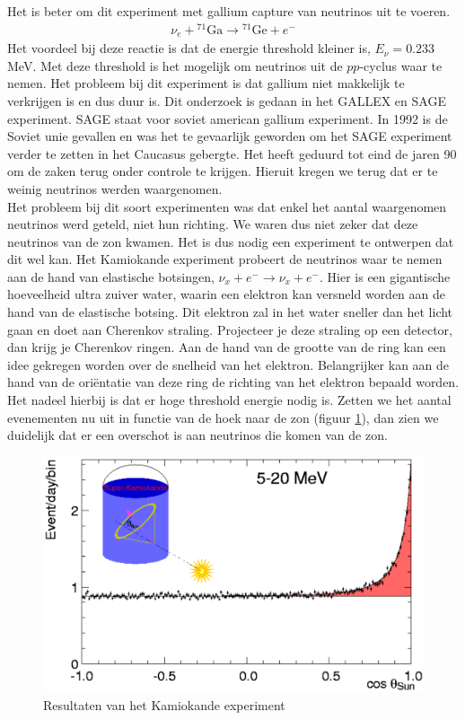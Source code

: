 \documentclass[../main.tex]{subfiles}
\begin{document}
Het is beter om dit experiment met gallium capture van neutrinos uit te voeren.
\begin{equation}
    \begin{aligned}
        \label{eq:ga_neutrino_capture}
        \nu_{e}+{ }^{71} \mathrm{Ga} \rightarrow{ }^{71} \mathrm{Ge}+e^{-}
    \end{aligned}
\end{equation}
Het voordeel bij deze reactie is dat de energie threshold kleiner is, $E_\nu = 0.233$MeV. Met deze threshold is het mogelijk om neutrinos uit de $pp$-cyclus waar te nemen. Het probleem bij dit experiment is dat gallium niet makkelijk te verkrijgen is en dus duur is. Dit onderzoek is gedaan in het GALLEX en SAGE experiment. SAGE staat voor soviet american gallium experiment. In 1992 is de Soviet unie gevallen en was het te gevaarlijk geworden om het SAGE experiment verder te zetten in het Caucasus gebergte. Het heeft geduurd tot eind  de jaren 90 om de zaken terug onder controle te krijgen. Hieruit kregen we terug dat er te weinig neutrinos werden waargenomen.\\
Het probleem bij dit soort experimenten was dat enkel het aantal waargenomen neutrinos werd geteld, niet hun richting. We waren dus niet zeker dat deze neutrinos van de zon kwamen. Het is dus nodig een experiment te ontwerpen dat dit wel kan. Het Kamiokande experiment probeert de neutrinos waar te nemen aan de hand van elastische botsingen, $\nu_{x}+e^{-} \rightarrow \nu_{x}+e^{-}$. Hier is een gigantische hoeveelheid ultra zuiver water, waarin een elektron kan versneld worden aan de hand van de elastische botsing. Dit elektron zal in het water sneller dan het licht gaan en doet aan Cherenkov straling. Projecteer je deze straling op een detector, dan krijg je Cherenkov ringen. Aan de hand van de grootte van de ring kan een idee gekregen worden over de snelheid van het elektron. Belangrijker kan aan de hand van de oriëntatie van deze ring de richting van het elektron bepaald worden. Het nadeel hierbij is dat er hoge threshold energie nodig is. Zetten we het aantal evenementen nu uit in functie van de hoek naar de zon (figuur \ref{fig:neutrinos/kamiokande_results}), dan zien we duidelijk dat er een overschot is aan neutrinos die komen van de zon.

\begin{figure}[h]
    \centering
    \includegraphics[width=0.5\linewidth]{neutrinos/kamiokande_results.png}
    \caption{Resultaten van het Kamiokande experiment}%
    \label{fig:neutrinos/kamiokande_results}
\end{figure}
\end{document}
